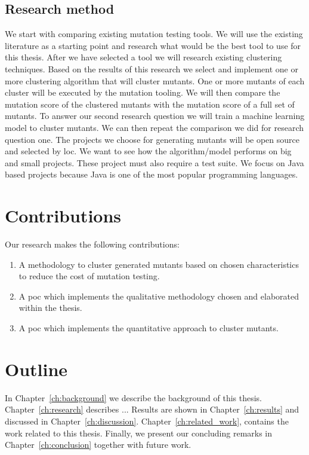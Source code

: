 \documentclass[../main]{subfiles}
\begin{document}
\subsection{Research method}
We start with comparing existing mutation testing tools. 
We will use the existing literature as a starting point and research what would be the best tool to use for this thesis.
\newline
After we have selected a tool we will research existing clustering techniques.
Based on the results of this research we select and implement one or more clustering algorithm that will cluster mutants. 
One or more mutants of each cluster will be executed by the mutation tooling.
We will then compare the mutation score of the clustered mutants with the mutation score of a full set of mutants.
\newline
To answer our second research question we will train a machine learning model to cluster mutants.
We can then repeat the comparison we did for research question one. 
\newline
The projects we choose for generating mutants will be open source and selected by \acrfull{loc}. 
We want to see how the algorithm/model performs on big and small projects.
These project must also require a test suite.
\newline
We focus on Java based projects because Java is one of the most popular programming languages\cite{Tiobe}.

\section{Contributions}
Our research makes the following contributions:
\begin{enumerate}
 \item A methodology to cluster generated mutants based on chosen characteristics to reduce the cost of mutation testing.
 \item A \acrfull{poc} which implements the qualitative methodology chosen and elaborated within the thesis.
 \item A \acrfull{poc} which implements the quantitative approach to cluster mutants. 
\end{enumerate}

\section{Outline}
In Chapter~\ref{ch:background} we describe the background of this thesis. 
Chapter~\ref{ch:research} describes ... 
Results are shown in Chapter~\ref{ch:results} and discussed in Chapter~\ref{ch:discussion}. Chapter~\ref{ch:related_work}, contains the work related to this thesis.
Finally, we present our concluding remarks in Chapter~\ref{ch:conclusion} together with future work.
\end{document}
